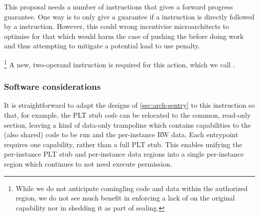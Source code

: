 This proposal needs a number of instructions that gives a forward progress guarantee.
One way is to only give a guarantee if a  instruction is directly followed by a  instruction.
However, this could wrong incentivise microarchitects to optimise for that which would harm the case of pushing the  before doing work and thus attempting to mitigate a potential load to use penalty.


%
\footnote{While we do not anticipate comingling code and data within the
authorized region, we do not see much benefit in enforcing a lack of
\cappermX on the original capability nor in shedding it as part of
sealing.
%
%
}
%
A new, two-operand instruction is required for this action, which we call
.

\subsubsection{Software considerations}

It is straightforward to adapt the designs of \cref{sec:arch-sentry} to this
instruction so that, for example, the PLT stub \emph{code} can be relocated to
the common, read-only section, leaving a kind of data-only trampoline which
contains capabilities to the (also shared) code to be run and the per-instance
RW data.  Each entrypoint requires one capability, rather than a full PLT stub.
This enables unifying the per-instance PLT stub and per-instance data regions
into a single per-instance region which continues to not need execute
permission.

